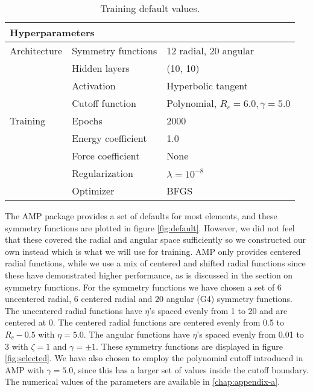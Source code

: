 \begin{table}[H]
\centering
\begin{tabular}{@{}lll@{}}
\toprule
\multicolumn{3}{l}{Hyperparameters}                                    \\ \midrule
Architecture & Symmetry functions & 12 radial, 20 angular               \\
             & Hidden layers      & (10, 10)                           \\
             & Activation         & Hyperbolic tangent                 \\
             & Cutoff function    & Polynomial, $R_c = 6.0, \gamma = 5.0$
             \\
Training     & Epochs             & 2000                               \\
             & Energy coefficient & 1.0                                \\
             & Force coefficient  & None                                \\
             & Regularization     & $\lambda = 10^{-8}$                \\
             & Optimizer          & BFGS                               \\ \bottomrule
\end{tabular}
\caption{Training default values.}
\label{table:defaults}
\end{table}

The AMP package provides a set of defaults for most elements,
and these symmetry functions are plotted in figure \ref{fig:default}.
However, we did not feel that these covered the radial and angular space
sufficiently so we constructed our own instead which is what we will
use for training. AMP only provides centered radial functions,
while we use a mix of centered and shifted radial functions
since these have demonstrated higher performance, as is discussed
in the section on symmetry functions.
For the symmetry functions we have chosen a set of 6 uncentered radial,
6 centered radial and 20 angular (G4)
symmetry functions.
The uncentered radial functions have $\eta$'s spaced evenly
from 1 to 20 and are centered at 0. The centered radial functions
are centered evenly from 0.5 to $R_c - 0.5$ with $\eta = 5.0$.
The angular functions have $\eta$'s spaced evenly from
0.01 to 3 with $\zeta = 1$ and $\gamma = \pm 1$.
These symmetry functions are displayed in figure \ref{fig:selected}.
We have also chosen to employ the polynomial cutoff introduced in AMP
with $\gamma = 5.0$,
since this has a larger set of values inside the cutoff boundary.
The numerical values of the parameters are available in \ref{chap:appendix-a}.

